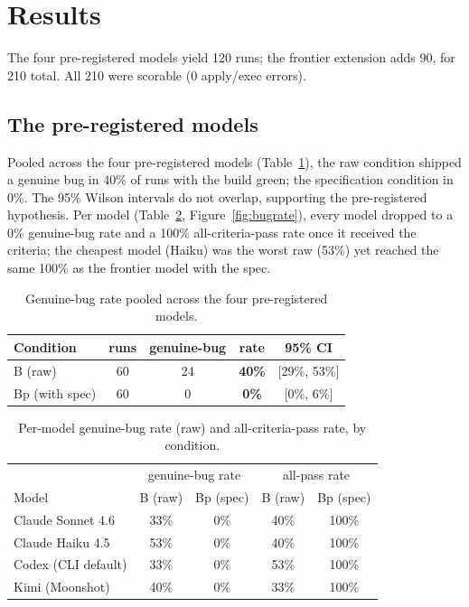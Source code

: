 \documentclass[11pt]{article}
\begin{document}
\section{Results}
\label{sec:results}

The four pre-registered models yield 120 runs; the frontier extension adds 90, for 210 total. All 210 were scorable (0 apply/exec errors).

\subsection{The pre-registered models}
Pooled across the four pre-registered models (Table~\ref{tab:pooled}), the raw condition shipped a genuine bug in 40\% of runs with the build green; the specification condition in 0\%. The 95\% Wilson intervals do not overlap, supporting the pre-registered hypothesis. Per model (Table~\ref{tab:permodel}, Figure~\ref{fig:bugrate}), every model dropped to a 0\% genuine-bug rate and a 100\% all-criteria-pass rate once it received the criteria; the cheapest model (Haiku) was the worst raw (53\%) yet reached the same 100\% as the frontier model with the spec.

\begin{table}[h]
\centering
\caption{Genuine-bug rate pooled across the four pre-registered models.}
\label{tab:pooled}
\begin{tabular}{lcccc}
\toprule
Condition & runs & genuine-bug & rate & 95\% CI \\
\midrule
B (raw) & 60 & 24 & \textbf{40\%} & [29\%, 53\%] \\
Bp (with spec) & 60 & 0 & \textbf{0\%} & [0\%, 6\%] \\
\bottomrule
\end{tabular}
\end{table}

\begin{table}[h]
\centering
\caption{Per-model genuine-bug rate (raw) and all-criteria-pass rate, by condition.}
\label{tab:permodel}
\begin{tabular}{lcc cc}
\toprule
& \multicolumn{2}{c}{genuine-bug rate} & \multicolumn{2}{c}{all-pass rate} \\
Model & B (raw) & Bp (spec) & B (raw) & Bp (spec) \\
\midrule
Claude Sonnet 4.6 & 33\% & 0\% & 40\% & 100\% \\
Claude Haiku 4.5 & 53\% & 0\% & 40\% & 100\% \\
Codex (CLI default) & 33\% & 0\% & 53\% & 100\% \\
Kimi (Moonshot) & 40\% & 0\% & 33\% & 100\% \\
\bottomrule
\end{tabular}
\end{table}
\end{document}
